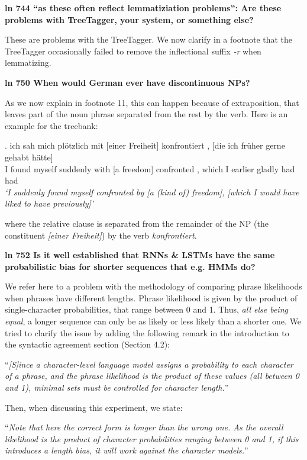 \documentclass{article}[11pt,a4paper,oneside]
\begin{document}
\textbf{ln 744 ``as these often reflect lemmatiziation problems'': Are these problems with TreeTagger, your system, or something else?}

These are problems with the TreeTagger. We now clarify in a footnote that the TreeTagger occasionally failed to remove the inflectional suffix \textit{-r} when lemmatizing.
\newline

\textbf{ln 750 When would German ever have discontinuous NPs?}

As we now explain in footnote 11, this can happen because of extraposition, that leaves part of the noun phrase separated from the rest by the verb. Here is an example for the treebank:

\exg. ich sah   mich   plötzlich mit  [einer Freiheit] konfrontiert , [die   ich früher  gerne  gehabt hätte] \\
I   found myself suddenly  with [a     freedom]  confronted   ,  which I   earlier gladly had    had \\
\textit{`I suddenly found myself confronted by [a (kind of) freedom], [which I would have liked to have previously]'}

where the relative clause is separated from the remainder of the NP (the constituent \textit{[einer Freiheit]}) by the verb \textit{konfrontiert}.
\newline

\textbf{ln 752 Is it well established that RNNs \& LSTMs have the same probabilistic bias for shorter sequences that e.g. HMMs do?}

We refer here to a problem with the methodology of comparing phrase likelihoods when phrases have different lengths. Phrase likelihood is given by the product of single-character probabilities, that range between 0 and 1. Thus, \emph{all else being equal}, a longer sequence can only be as likely or less likely than a shorter one. We tried to clarify the issue by adding the following remark in the introduction to the syntactic agreement section (Section 4.2):

``\textit{[S]ince a character-level language model assigns a probability to each character of a phrase, and the phrase likelihood is the product of these values (all between 0 and 1), minimal sets must be controlled for character length.}''

Then, when discussing this experiment, we state:

``\textit{Note that here the correct form is longer than the wrong one. As the overall likelihood is the product of character probabilities ranging between 0 and 1, if this introduces a length bias, it will work against the character models.}''
\newline
\end{document}
